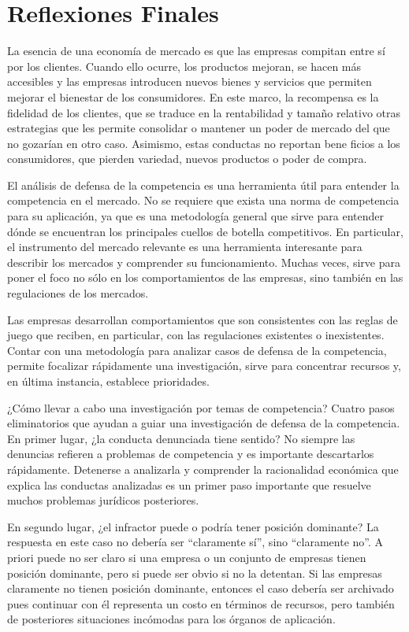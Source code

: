 \documentclass[
  12pt,
  spanish,
]{book}
\begin{document}
\hypertarget{reflexiones-finales}{%
\section{Reflexiones Finales}\label{reflexiones-finales}}

La esencia de una economía de mercado es que las empresas compitan entre
sí por los clientes. Cuando ello ocurre, los productos mejoran, se hacen
más accesibles y las empresas introducen nuevos bienes y servicios que
permiten mejorar el bienestar de los consumidores. En este marco, la
recompensa es la fidelidad de los clientes, que se traduce en la
rentabilidad y tamaño relativo otras estrategias que les permite
consolidar o mantener un poder de mercado del que no gozarían en otro
caso. Asimismo, estas conductas no reportan bene ficios a los
consumidores, que pierden variedad, nuevos productos o poder de compra.

El análisis de defensa de la competencia es una herramienta útil para
entender la competencia en el mercado. No se requiere que exista una
norma de competencia para su aplicación, ya que es una metodología
general que sirve para entender dónde se encuentran los principales
cuellos de botella competitivos. En particular, el instrumento del
mercado relevante es una herramienta interesante para describir los
mercados y comprender su funcionamiento. Muchas veces, sirve para poner
el foco no sólo en los comportamientos de las empresas, sino también en
las regulaciones de los mercados.

Las empresas desarrollan comportamientos que son consistentes con las
reglas de juego que reciben, en particular, con las regulaciones
existentes o inexistentes. Contar con una metodología para analizar
casos de defensa de la competencia, permite focalizar rápidamente una
investigación, sirve para concentrar recursos y, en última instancia,
establece prioridades.

¿Cómo llevar a cabo una investigación por temas de competencia? Cuatro
pasos eliminatorios que ayudan a guiar una investigación de defensa de
la competencia. En primer lugar, ¿la conducta denunciada tiene sentido?
No siempre las denuncias refieren a problemas de competencia y es
importante descartarlos rápidamente. Detenerse a analizarla y comprender
la racionalidad económica que explica las conductas analizadas es un
primer paso importante que resuelve muchos problemas jurídicos
posteriores.

En segundo lugar, ¿el infractor puede o podría tener posición dominante?
La respuesta en este caso no debería ser ``claramente sí'', sino
``claramente no''. A priori puede no ser claro si una empresa o un
conjunto de empresas tienen posición dominante, pero si puede ser obvio
si no la detentan. Si las empresas claramente no tienen posición
dominante, entonces el caso debería ser archivado pues continuar con él
representa un costo en términos de recursos, pero también de posteriores
situaciones incómodas para los órganos de aplicación.
\end{document}
